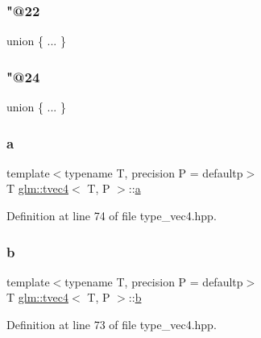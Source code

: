 \mbox{\label{structglm_1_1tvec4_a166006114856344eed839ad4c0c2a783}} 
\subsubsection{\texorpdfstring{"@22}{@22}}
{\footnotesize\ttfamily union \{ ... \} }

\mbox{\label{structglm_1_1tvec4_a10f72fa28ec25ff377e58e3b158a0e63}} 
\subsubsection{\texorpdfstring{"@24}{@24}}
{\footnotesize\ttfamily union \{ ... \} }

\mbox{\label{structglm_1_1tvec4_af29edf476662a7e12d5ded3b71376394}} 
\subsubsection{\texorpdfstring{a}{a}}
{\footnotesize\ttfamily template$<$typename T, precision P = defaultp$>$ \\
T \mbox{\hyperlink{structglm_1_1tvec4}{glm\+::tvec4}}$<$ T, P $>$\+::\mbox{\hyperlink{glad_8h_ac8729153468b5dcf13f971b21d84d4e5}{a}}}



Definition at line 74 of file type\+\_\+vec4.\+hpp.

\mbox{\label{structglm_1_1tvec4_a9f8158e691c3b15b078d9b61f93b69ca}} 
\subsubsection{\texorpdfstring{b}{b}}
{\footnotesize\ttfamily template$<$typename T, precision P = defaultp$>$ \\
T \mbox{\hyperlink{structglm_1_1tvec4}{glm\+::tvec4}}$<$ T, P $>$\+::\mbox{\hyperlink{glad_8h_a6eba317e3cf44d6d26c04a5a8f197dcb}{b}}}



Definition at line 73 of file type\+\_\+vec4.\+hpp.

